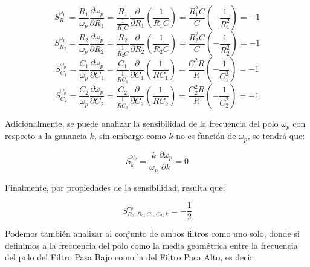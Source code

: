 \documentclass[12pt,a4paper]{article}
\begin{document}
\begin{equation}
    \label{eq_50}
    S_{R_{1}}^{\omega_{p}} = \frac{R_{1}}{\omega_{p}}\frac{\partial \omega_{p}}{\partial R_{1}} = \frac{R_{1}}{\frac{1}{R_{1}C}}\frac{\partial}{\partial R_{1}}\left(\frac{1}{R_{1}C}\right) = \frac{R_{1}^{2}C}{C} \left(-\frac{1}{R_{1}^{2}}\right) = - 1
\end{equation}
\begin{equation}
    \label{eq_51}
    S_{R_{2}}^{\omega_{p}} = \frac{R_{2}}{\omega_{p}}\frac{\partial \omega_{p}}{\partial R_{2}} = \frac{R_{2}}{\frac{1}{R_{2}C}}\frac{\partial}{\partial R_{2}}\left(\frac{1}{R_{2}C}\right) = \frac{R_{2}^{2}C}{C} \left(-\frac{1}{R_{2}^2}\right) = - 1
\end{equation}
\begin{equation}
    \label{eq_52}
    S_{C_{1}}^{\omega_{p}} = \frac{C_{1}}{\omega_{p}}\frac{\partial \omega_{p}}{\partial C_{1}} = \frac{C_{1}}{\frac{1}{RC_{1}}}\frac{\partial}{\partial C_{1}}\left(\frac{1}{RC_{1}}\right) = \frac{C_{1}^{2}R}{R} \left(-\frac{1}{C_{1}^2}\right) = - 1
\end{equation}
\begin{equation}
    \label{eq_53}
    S_{C_{2}}^{\omega_{p}} = \frac{C_{2}}{\omega_{p}}\frac{\partial \omega_{p}}{\partial C_{2}} = \frac{C_{2}}{\frac{1}{RC_{2}}}\frac{\partial}{\partial C_{2}}\left(\frac{1}{RC_{2}}\right) = \frac{C_{2}^{2}R}{R} \left(-\frac{1}{C_{2}^2}\right) = - 1
\end{equation}

Adicionalmente, se puede analizar la sensibilidad de la frecuencia del polo $\omega_{p}$ con respecto a la ganancia $k$, sin embargo como $k$ no es función de $\omega_{p}$, se tendrá que:

\begin{equation}
    \label{eq_54}
    S_{k}^{\omega_{p}} = \frac{k}{\omega_{p}}\frac{\partial \omega_{p}}{\partial k} = 0
\end{equation}

Finalmente, por propiedades de la sensibilidad, resulta que:

\begin{equation}
    \label{eq_55}
    S_{R_{1}, R_{2}, C_{1}, C_{2}, k}^{\omega_{p}} = - \frac{1}{2}
\end{equation}

Podemos también analizar al conjunto de ambos filtros como uno solo, donde si definimos a la frecuencia del polo como la media geométrica entre la frecuencia del polo del Filtro Pasa Bajo como la del Filtro Pasa Alto, es decir
\end{document}
